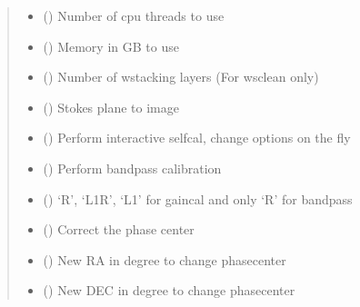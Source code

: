 \documentclass[letterpaper,10pt,english]{sphinxmanual}
\begin{document}
\begin{fulllineitems}
\begin{fulllineitems}
\begin{quote}
\begin{description}
\begin{itemize}
\item {} 
\sphinxAtStartPar
{} () \textendash{} Number of cpu threads to use

\item {} 
\sphinxAtStartPar
{} () \textendash{} Memory in GB to use

\item {} 
\sphinxAtStartPar
{} () \textendash{} Number of w\sphinxhyphen{}stacking layers (For wsclean only)

\item {} 
\sphinxAtStartPar
{} () \textendash{} Stokes plane to image

\item {} 
\sphinxAtStartPar
{} () \textendash{} Perform interactive selfcal, change options on the fly

\item {} 
\sphinxAtStartPar
{} () \textendash{} Perform bandpass calibration

\item {} 
\sphinxAtStartPar
{} () \textendash{} ‘R’, ‘L1R’, ‘L1’ for gaincal and only ‘R’ for bandpass

\item {} 
\sphinxAtStartPar
{} () \textendash{} Correct the phase center

\item {} 
\sphinxAtStartPar
{} () \textendash{} New RA in degree to change phasecenter

\item {} 
\sphinxAtStartPar
{} () \textendash{} New DEC in degree to change phasecenter


\end{itemize}
\end{description}
\end{quote}
\end{fulllineitems}
\end{fulllineitems}
\end{document}
